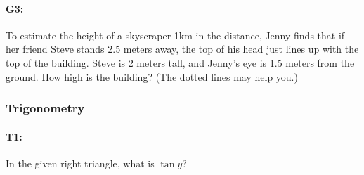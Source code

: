 \documentclass[pdftex, brazil, 12pt, twoside]{article}
\begin{document}
\paragraph{G3:} To estimate the height of a skyscraper 1km in the distance, Jenny finds that if her friend Steve stands 2.5 meters away, the top of his head just lines up with the top of the building. Steve is 2 meters tall, and Jenny's eye is 1.5 meters from the ground. How high is the building? (The dotted lines may help you.)

\begin{figure}[H]
  \begin{center}
    \label{fig:adv-g3}
  \end{center}
\end{figure}

\subsubsection{Trigonometry}
\label{gs-adventure-trigonometry}

\paragraph{T1:} In the given right triangle, what is $\tan{y}$?

\begin{figure}[H]
  \begin{center}
    \label{fig:adv-t1}
  \end{center}
\end{figure}
\end{document}
